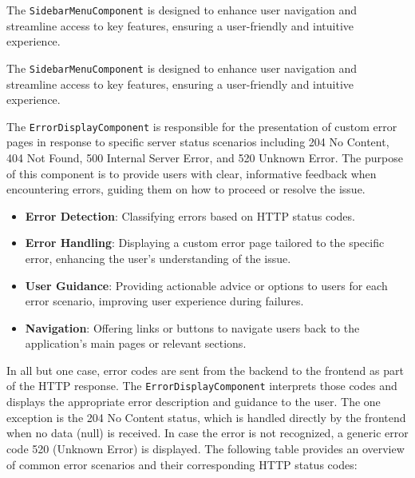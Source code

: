 The \texttt{SidebarMenuComponent} is designed to enhance user navigation and streamline access to key features, ensuring a user-friendly and intuitive experience.

The \texttt{SidebarMenuComponent} is designed to enhance user navigation and streamline access to key features, ensuring a user-friendly and intuitive experience.


The \texttt{ErrorDisplayComponent} is responsible for the presentation of custom error pages in response to specific server status scenarios including 204 No Content, 404 Not Found, 500 Internal Server Error, and 520 Unknown Error.
The purpose of this component is to provide users with clear, informative feedback when encountering errors, guiding them on how to proceed or resolve the issue.

\begin{itemize}
    \item \textbf{Error Detection}: Classifying errors based on HTTP status codes.
    \item \textbf{Error Handling}: Displaying a custom error page tailored to the specific error, enhancing the user's understanding of the issue.
    \item \textbf{User Guidance}: Providing actionable advice or options to users for each error scenario, improving user experience during failures.
    \item \textbf{Navigation}: Offering links or buttons to navigate users back to the application's main pages or relevant sections.
\end{itemize}

In all but one case, error codes are sent from the backend to the frontend as part of the HTTP response. The \texttt{ErrorDisplayComponent} interprets those codes and displays the appropriate error description and guidance to the user.
The one exception is the 204 No Content status, which is handled directly by the frontend when no data (null) is received. In case the error is not recognized, a generic error code 520 (Unknown Error) is displayed.
The following table provides an overview of common error scenarios and their corresponding HTTP status codes:

